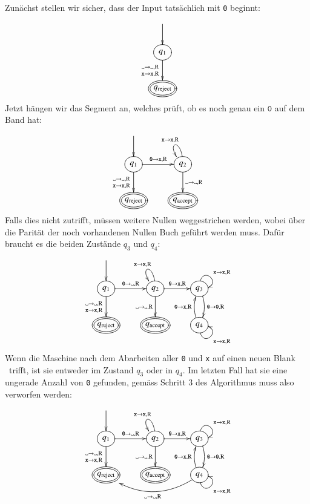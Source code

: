 Zunächst stellen wir sicher, dass der Input tatsächlich mit \texttt{0}
beginnt:
\[
\entrymodifiers={++[o][F]}
\xymatrix{
*+\txt{}\ar[d]
\\
{q_1}\ar[d]_{\genfrac{}{}{0pt}{1}{\blank\to\blank,\text{R}}{{\tt x}\to{\tt x},\text{R}}}
\\
*++[o][F=]{q_\text{reject}}
}
\]
Jetzt hängen wir das Segment an, welches prüft, ob es noch genau ein $\texttt{0}$
auf dem Band hat:
\[
\entrymodifiers={++[o][F]}
\xymatrix{
*+\txt{}\ar[d]
\\
{q_1}\ar[d]_{\genfrac{}{}{0pt}{1}{\blank\to\blank,\text{R}}{{\tt x}\to{\tt x},\text{R}}}
	\ar[r]^{\texttt{0}\to{\tt x},\text{R}}
	&{q_2}\ar[d]^{\blank\to\blank,\text{R}}
              \ar@(u,ul)_{{\tt x}\to {\tt x},\text{R}}
\\
*++[o][F=]{q_{\text{reject}}}
	&*++[o][F=]{q_\text{accept}}
}
\]
Falls dies nicht zutrifft, müssen weitere Nullen weggestrichen werden,
wobei über die Parität der noch vorhandenen Nullen Buch geführt werden
muss. Dafür braucht es die beiden Zustände $q_3$ und $q_4$:
\[
\entrymodifiers={++[o][F]}
\xymatrix{
*+\txt{}\ar[d]
\\
{q_1}\ar[d]_{\genfrac{}{}{0pt}{1}{\blank\to\blank,\text{R}}{{\tt x}\to{\tt x},\text{R}}}
	\ar[r]^{\texttt{0}\to\blank,\text{R}}
	&{q_2}\ar[d]_{\blank\to\blank,\text{R}}
	      \ar[r]^{\texttt{0}\to{\tt x},\text{R}}
              \ar@(u,ul)_{{\tt x}\to {\tt x},\text{R}}
		&{q_3}\ar@(u,r)^{{\tt x}\to{\tt x},\text{R}}
		      \ar@/^/[d]^{\texttt{0}\to \texttt{0},\text{R}}
\\
*++[o][F=]{q_\text{reject}}
	&*++[o][F=]{q_\text{accept}}
		&{q_4}\ar@/^/[u]^{\texttt{0}\to {\tt x},\text{R}}
		      \ar@(d,r)_{{\tt x}\to{\tt x},\text{R}}
}
\]
Wenn die Maschine nach dem Abarbeiten aller \texttt{0} und {\tt x} auf einen
neuen Blank \textvisiblespace\ trifft, ist sie entweder im Zustand
$q_3$ oder in $q_4$. Im letzten Fall hat sie eine ungerade Anzahl
von \texttt{0} gefunden, gemäss Schritt 3 des Algorithmus muss also verworfen
werden:
\[
\entrymodifiers={++[o][F]}
\xymatrix{
*+\txt{}\ar[d]
\\
{q_1}\ar[d]_{\genfrac{}{}{0pt}{1}{\blank\to\blank,\text{R}}{{\tt x}\to{\tt x},\text{R}}}
	\ar[r]^{\texttt{0}\to\blank,\text{R}}
	&{q_2}\ar[d]_{\blank\to\blank,\text{R}}
	      \ar[r]^{\texttt{0}\to{\tt x},\text{R}}
              \ar@(u,ul)_{{\tt x}\to {\tt x},\text{R}}
		&{q_3}\ar@(u,r)^{{\tt x}\to{\tt x},\text{R}}
		      \ar@/^/[d]^{\texttt{0}\to \texttt{0},\text{R}}
\\
*++[o][F=]{q_\text{reject}}
	&*++[o][F=]{q_\text{accept}}
		&{q_4}\ar@/^/[u]^{\texttt{0}\to {\tt x},\text{R}}
		      \ar@(d,r)_{{\tt x}\to{\tt x},\text{R}}
		      \ar@/^20pt/[ll]^{\blank\to\blank,\text{R}}
}
\]
